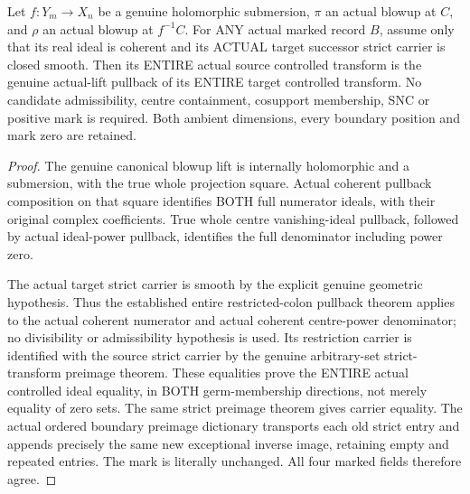 \begin{theorem}
\label{hir:original-untested-controlled-smooth-entire-step}
\leanok
Let $f:Y_m\to X_n$ be a genuine holomorphic submersion, $\pi$ an actual
blowup at $C$, and $\rho$ an actual blowup at $f^{-1}C$. For ANY actual
marked record $B$, assume only that its real ideal is coherent and its
ACTUAL target successor strict carrier is closed smooth. Then its ENTIRE
actual source controlled transform is the genuine actual-lift pullback
of its ENTIRE target controlled transform. No candidate admissibility,
centre containment, cosupport membership, SNC or positive mark is required.
Both ambient dimensions, every boundary position and mark zero are retained.
\end{theorem}
\begin{proof}
The genuine canonical blowup lift is internally holomorphic and a
submersion, with the true whole projection square. Actual coherent
pullback composition on that square identifies BOTH full numerator
ideals, with their original complex coefficients. True whole centre
vanishing-ideal pullback, followed by actual ideal-power pullback,
identifies the full denominator including power zero.

The actual target strict carrier is smooth by the explicit genuine
geometric hypothesis. Thus the established entire restricted-colon
pullback theorem applies to the actual coherent numerator and actual
coherent centre-power denominator; no divisibility or admissibility
hypothesis is used. Its restriction carrier is identified with the
source strict carrier by the genuine arbitrary-set strict-transform
preimage theorem. These equalities prove the ENTIRE actual controlled
ideal equality, in BOTH germ-membership directions, not merely equality
of zero sets. The same strict preimage theorem gives carrier equality.
The actual ordered boundary preimage dictionary transports each old
strict entry and appends precisely the same new exceptional inverse
image, retaining empty and repeated entries. The mark is literally
unchanged. All four marked fields therefore agree.
\end{proof}

